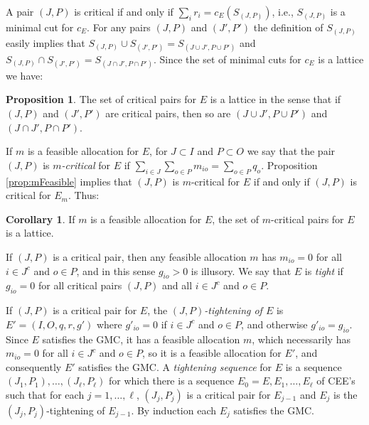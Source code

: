 \documentclass[12pt, A4paper]{article}
\theoremstyle{definition}
\newtheorem{prop}{Proposition}
\newtheorem{cor}{Corollary}
\begin{document}

A pair $(J,P)$ is critical if and only if $\sum_i r_i = c_E(S_{(J,P)})$, i.e., $S_{(J,P)}$ is a minimal cut for $c_E$.  For any pairs $(J,P)$ and $(J',P')$ the definition of $S_{(J,P)}$ easily implies that $S_{(J,P)} \cup S_{(J',P')} = S_{(J \cup J',P \cup P')}$ and $S_{(J,P)} \cap S_{(J',P')} = S_{(J \cap J',P \cap P')}.$ Since the set of minimal cuts for $c_E$ is a lattice we have:

\begin{prop}
The set of critical pairs for $E$ is a lattice in the sense that if  $(J,P)$ and $(J',P')$
are critical pairs, then so are $(J \cup J',P \cup P')$ and $(J \cap J',P \cap P')$.  
\end{prop}

If $m$ is a feasible allocation for $E$, for $J \subset I$ and $P \subset O$ we say that the pair $(J,P)$ is \emph{$m$-critical} for $E$ if $\sum_{i \in J} \sum_{o \in P} m_{io} = \sum_{o \in P} q_o.$ Proposition \ref{prop:mFeasible} implies that $(J,P)$ is $m$-critical for $E$ if and only if $(J,P)$ is critical for $E_m$.  Thus:

\begin{cor} \label{cor:mCritical}
If $m$ is a feasible allocation for $E$, the set of $m$-critical pairs for $E$ is a lattice.  
\end{cor}

If $(J,P)$ is a critical pair, then any feasible allocation $m$ has $m_{io} = 0$ for all $i \in J^c$ and $o \in P$, and in this sense $g_{io} > 0$ is illusory. We say that $E$ is \emph{tight} if $g_{io} = 0$ for all critical pairs $(J,P)$ and all $i \in J^c$ and $o \in P$.   

If $(J,P)$ is a critical pair for $E$, the \emph{$(J,P)$-tightening of $E$} is $E' = (I,O,q,r,g')$ where $g'_{io} = 0$ if $i \in J^c$ and $o \in P$, and otherwise $g'_{io} = g_{io}$.  Since $E$ satisfies the GMC, it has a feasible allocation $m$, which necessarily has $m_{io} = 0$ for all $i \in J^c$ and $o \in P$, so it is a feasible allocation for $E'$, and consequently $E'$ satisfies the GMC.  
A \emph{tightening sequence} for $E$ is a sequence $(J_1,P_1), \ldots, (J_\ell,P_\ell)$ for which there is a sequence $E_0 = E, E_1, \ldots, E_\ell$ of CEE's such that for each $j = 1, \ldots, \ell$, $(J_j,P_j)$ is a critical pair for $E_{j-1}$ and $E_j$ is the $(J_j,P_j)$-tightening of $E_{j-1}$.  By induction each $E_j$ satisfies the GMC.  
\end{document}
